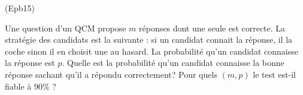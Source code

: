 \begin{tiny}(Epb15)\end{tiny} Une question d'un QCM propose $m$ réponses dont une seule est correcte. La stratégie des candidats est la suivante : si un candidat connait la réponse, il la coche sinon il en choisit une au hasard. La probabilité qu'un candidat connaisse la réponse est $p$.\newline
Quelle est la probabilité qu'un candidat connaisse la bonne réponse sachant qu'il a répondu correctement? Pour quels $(m,p)$ le test est-il fiable à 90\% ?
